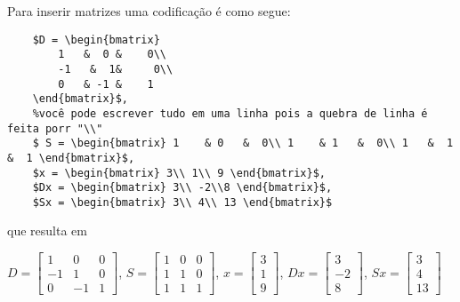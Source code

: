 Para inserir matrizes  uma codificação é como segue:
\begin{verbatim}
	$D = \begin{bmatrix} 
		1   &  0 &    0\\
		-1   &  1&     0\\
		0   & -1 &    1
	\end{bmatrix}$, 
	%você pode escrever tudo em uma linha pois a quebra de linha é feita porr "\\"
	$ S = \begin{bmatrix} 1    & 0   &  0\\ 1    & 1   &  0\\ 1   &  1   &  1 \end{bmatrix}$,
	$x = \begin{bmatrix} 3\\ 1\\ 9 \end{bmatrix}$,   
	$Dx = \begin{bmatrix} 3\\ -2\\8 \end{bmatrix}$, 
	$Sx = \begin{bmatrix} 3\\ 4\\ 13 \end{bmatrix}$
\end{verbatim}

que resulta em

$D = \begin{bmatrix} 
	1   &  0 &    0\\
	-1   &  1&     0\\
	0   & -1 &    1
\end{bmatrix}$, 
$ S = \begin{bmatrix} 1    & 0   &  0\\ 1    & 1   &  0\\ 1   &  1   &  1 \end{bmatrix}$,
$x = \begin{bmatrix} 3\\ 1\\ 9 \end{bmatrix}$,   $Dx = \begin{bmatrix} 3\\ -2\\8 \end{bmatrix}$, $Sx = \begin{bmatrix} 3\\ 4\\ 13 \end{bmatrix}$

